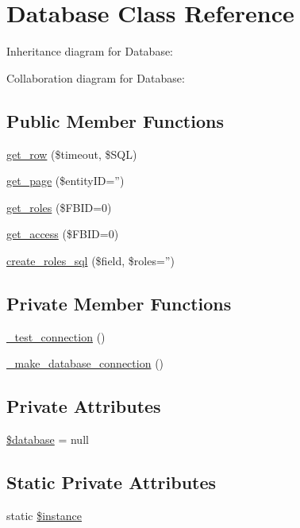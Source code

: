 \hypertarget{classDatabase}{
\section{Database Class Reference}
\label{classDatabase}
}


Inheritance diagram for Database:


Collaboration diagram for Database:
\subsection*{Public Member Functions}
\begin{DoxyCompactItemize}
\item 
\hyperlink{classDatabase_a857aae71234bb70e0e3ac595e54baae4}{get\_\-row} (\$timeout, \$SQL)
\item 
\hyperlink{classDatabase_afc44d9a028275d73923a374b80520774}{get\_\-page} (\$entityID='')
\item 
\hyperlink{classDatabase_a4adac88286bc35d852c989bc578a720e}{get\_\-roles} (\$FBID=0)
\item 
\hyperlink{classDatabase_a3b626ff2a6dbeccfcce8d317db1290b2}{get\_\-access} (\$FBID=0)
\item 
\hyperlink{classDatabase_a5604ce928425fbaae355c50fc9ade1e7}{create\_\-roles\_\-sql} (\$field, \$roles='')
\end{DoxyCompactItemize}
\subsection*{Private Member Functions}
\begin{DoxyCompactItemize}
\item 
\hyperlink{classDatabase_af11d58f55017b2f1954dce69ecc9072f}{\_\-test\_\-connection} ()
\item 
\hyperlink{classDatabase_a16870e7c667f514a099afacc1009252b}{\_\-make\_\-database\_\-connection} ()
\end{DoxyCompactItemize}
\subsection*{Private Attributes}
\begin{DoxyCompactItemize}
\item 
\hyperlink{classDatabase_a7691c0162d89de0b6ba47edcd8ba8878}{\$database} = null
\end{DoxyCompactItemize}
\subsection*{Static Private Attributes}
\begin{DoxyCompactItemize}
\item 
static \hyperlink{classDatabase_ad9d7ce33ebb142b70e58b68052ca0ea8}{\$instance}
\end{DoxyCompactItemize}


